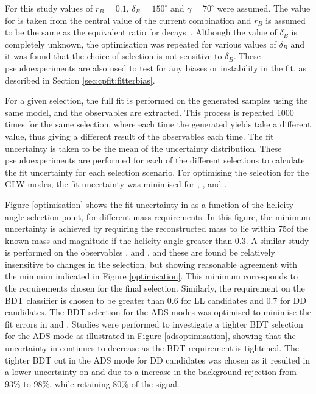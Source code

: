 For this study values of $r_B = 0.1$, $\delta_B = 150^{\circ}$ and $\gamma = 70^{\circ}$ were assumed. The value for \Pgamma is taken from the central value of the current \lhcb combination and $r_B$ is assumed to be the same as the equivalent ratio for \decay{\Bm}{\D\Km} decays~\cite{LHCb-PAPER-2016-032}. Although the value of $\delta_B$ is completely unknown, the optimisation was repeated for various values of $\delta_B$ and it was found that the choice of selection is not sensitive to $\delta_B$.  These pseudoexperiments are also used to test for any biases or instability in the \CP fit, as described in Section \ref{sec:cpfit:fitterbias}.

For a given selection, the full \CP fit is performed on the generated samples using the same model, and the \CP observables are extracted. This process is repeated 1000 times for the same selection, where each time the generated yields take a different value, thus giving a different result of the \CP observables each time. The fit uncertainty is taken to be the mean of the uncertainty distribution. These pseudoexperiments are performed for each of the different selections to calculate the fit uncertainty for each selection scenario.  For optimising the selection for the GLW modes, the fit uncertainty was minimised for \Akk, \Rkk, \Apipi and \Rpipi. 

Figure \ref{optimisation} shows the fit uncertainty in \Rkk as a function of the \KS helicity angle selection point, for different \Kstar mass requirements. In this figure, the minimum uncertainty is achieved by requiring the reconstructed \Kstar mass to lie within 75\mevcc of the known \Kstar mass and magnitude if the \KS helicity angle greater than 0.3. A similar study is performed on the \CP observables \Akk, \Apipi and \Rpipi, and these are found be relatively insensitive to changes in the selection, but showing reasonable agreement with the minimim indicated in Figure \ref{optimisation}. This minimum corresponds to the \Kstar requirements chosen for the final selection. Similarly, the requirement on the BDT classifier is chosen to be greater than 0.6 for LL candidates and 0.7 for DD candidates. The BDT selection for the ADS modes was optimised to minimise the fit errors in \Rptwo and \Rmtwo. Studies were performed to investigate a tighter BDT selection for the ADS mode as illustrated in Figure \ref{adsoptimisation}, showing that the uncertainty in \Rptwo continues to decrease as the BDT requirement is tightened. The tighter BDT cut in the ADS mode for DD candidates was chosen as it resulted in a lower uncertainty on \Rptwo and \Rmtwo due to a increase in the background rejection from 93\% to 98\%, while retaining 80\% of the signal. 

